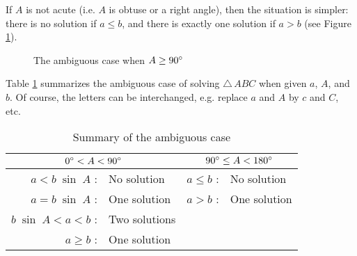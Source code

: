 If $A$ is not acute (i.e. $A$ is obtuse or a right angle), then the situation is simpler: there is
no solution if $a \le b$, and there is exactly one solution if $a > b$ (see Figure
\ref{fig:ambigobtuse}).
\newpage
\begin{figure}[h]
 \centering
 \qquad\qquad\qquad
 \vspace{-2mm}
 \caption[]{\quad The ambiguous case when $A \ge 90^\circ$}
 \label{fig:ambigobtuse}
\end{figure}\vspace{-1mm}

\noindent Table \ref{tbl:ambiguous} summarizes the ambiguous case of solving $\triangle\,ABC$ when
given $a$, $A$, and $b$. Of course, the letters can be interchanged, e.g. replace $a$ and $A$ by $c$
and $C$, etc.\vspace{-2mm}

\begin{table}[h]\centering
\caption{\quad Summary of the ambiguous case}\vspace{3mm}
\begin{tabular}{@{}|rl||rl|@{}}
 \hline
 \multicolumn{2}{|c||}{$0^\circ < A < 90^\circ$} &
  \multicolumn{2}{c|}{$90^\circ \le A < 180^\circ$}\\
 \hline
 $a < b\;\sin\;A$ : & No solution & $a \le b$ : & No solution\\
 $a = b\;\sin\;A$ : & One solution & $a > b$ : & One solution\\
 $b\;\sin\;A < a < b$ : & Two solutions & & \\
 $a \ge b$ : & One solution & & \\
 \hline
\end{tabular}\label{tbl:ambiguous}
\end{table}

